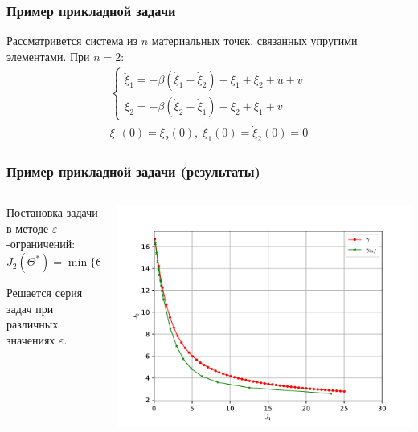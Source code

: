 \documentclass[aspectratio=1610]{beamer}
\begin{document}
\begin{frame}
  \frametitle{Пример прикладной задачи}
  Рассматривется система из \(n\) материальных точек, связанных упругими элементами.
  При \(n=2\):
  \begin{displaymath}
    \begin{array}{cr}
      \begin{cases}
        \ddot \xi_1 = -\beta(\dot\xi_1 - \dot\xi_2) - \xi_1 + \xi_2 + u + v \\
        \ddot \xi_2 = -\beta(\dot\xi_2 - \dot\xi_1) - \xi_2 + \xi_1 + v
      \end{cases} \\
      \xi_1(0)=\xi_2(0),\;\dot\xi_1(0)=\dot\xi_2(0)=0
  \end{array}
  \end{displaymath}
\end{frame}

\begin{frame}
  \frametitle{Пример прикладной задачи (результаты)}
  \begin{columns}
    \begin{column}{0.5\textwidth}

      Постановка задачи в методе \(\varepsilon\)-ограничений:
      \begin{displaymath}
        J_2(\Theta^*)=\min\{\Theta: J_1(\Theta) < \varepsilon\}
      \end{displaymath}

      Решается серия задач при различных значениях \(\varepsilon\).

    \end{column}
    \begin{column}{0.5\textwidth}
      \centerline{\includegraphics[width=1.2\textwidth]{solution.pdf}}
    \end{column}
  \end{columns}

\end{frame}
\end{document}
